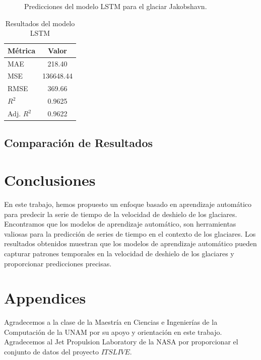 \documentclass[sigconf,authordraft,language=spanish]{acmart}
\begin{document}
\begin{figure}[htbp]
   \centering
   
    \caption{Predicciones del modelo LSTM para el glaciar Jakobshavn.}
    \label{fig:jakobshavn_lstm}
\end{figure}


\begin{table}[H]
  \caption{Resultados del modelo LSTM}
  \label{tab:lstm}
  \begin{tabular}{lc}
    \toprule
    Métrica & Valor \\
    \midrule
    MAE & 218.40 \\
    MSE & 136648.44 \\
    RMSE & 369.66 \\
    $R^2$ & 0.9625 \\
    Adj. $R^2$ & 0.9622 \\
    \bottomrule
  \end{tabular}
\end{table}

\subsection{Comparación de Resultados}

\section{Conclusiones}

En este trabajo, hemos propuesto un enfoque basado en aprendizaje automático para predecir la serie de tiempo de la velocidad de deshielo de los glaciares.
Encontramos que los modelos de aprendizaje automático, son herramientas valiosas para la predicción de series de tiempo en el contexto de los glaciares.
Los resultados obtenidos muestran que los modelos de aprendizaje automático pueden capturar patrones temporales en la velocidad de deshielo de los glaciares y proporcionar predicciones precisas.

\section{Appendices}
\begin{acks}
Agradecemos a la clase de la Maestría en Ciencias e Ingenierías de la Computación de la UNAM por su apoyo y orientación en este trabajo.
Agradecemos al Jet Propulsion Laboratory de la NASA por proporcionar el conjunto de datos del proyecto $ITSLIVE$.
\end{acks}




\appendix
\end{document}
